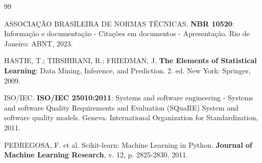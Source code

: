 \documentclass[12pt]{article}
\begin{document}
\begin{thebibliography}{99}

 ASSOCIAÇÃO BRASILEIRA DE NORMAS TÉCNICAS. \textbf{NBR 10520}: Informação e documentação - Citações em documentos - Apresentação. Rio de Janeiro: ABNT, 2023.

 HASTIE, T.; TIBSHIRANI, R.; FRIEDMAN, J. \textbf{The Elements of Statistical Learning}: Data Mining, Inference, and Prediction. 2. ed. New York: Springer, 2009.

 ISO/IEC. \textbf{ISO/IEC 25010:2011}: Systems and software engineering - Systems and software Quality Requirements and Evaluation (SQuaRE) System and software quality models. Geneva: International Organization for Standardization, 2011.

 PEDREGOSA, F. et al. Scikit-learn: Machine Learning in Python. \textbf{Journal of Machine Learning Research}, v. 12, p. 2825-2830, 2011.

\end{thebibliography}
\end{document}
